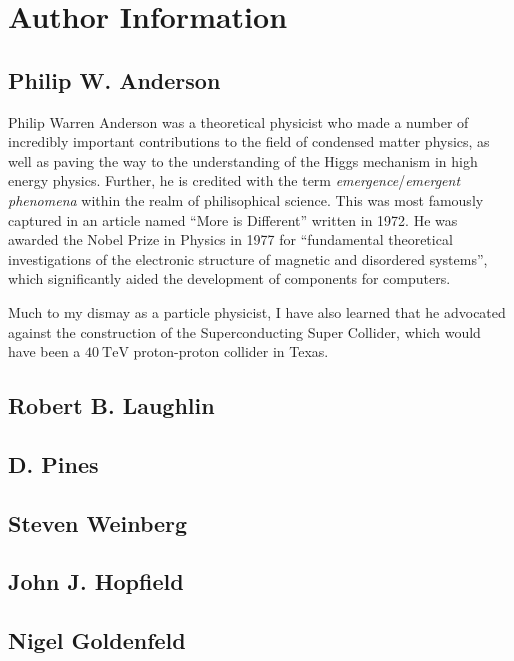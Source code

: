 \section{Author Information}

\subsection{Philip W. Anderson}
Philip Warren Anderson was a theoretical physicist who made a number of incredibly important contributions to the field of condensed matter physics, as well as paving the way to the understanding of the Higgs mechanism in high energy physics. Further, he is credited with the term \textit{emergence}/\textit{emergent phenomena} within the realm of philisophical science. This was most famously captured in an article named ``More is Different'' written in 1972. He was awarded the Nobel Prize in Physics in 1977 for ``fundamental theoretical investigations of the electronic structure of magnetic and disordered systems'', which significantly aided the development of components for computers.

Much to my dismay as a particle physicist, I have also learned that he advocated against the construction of the Superconducting Super Collider, which would have been a $\qty{40}{\tera\electronvolt}$ proton-proton collider in Texas.


\subsection{Robert B. Laughlin}



\subsection{D. Pines}


\subsection{Steven Weinberg}


\subsection{John J. Hopfield}


\subsection{Nigel Goldenfeld}


